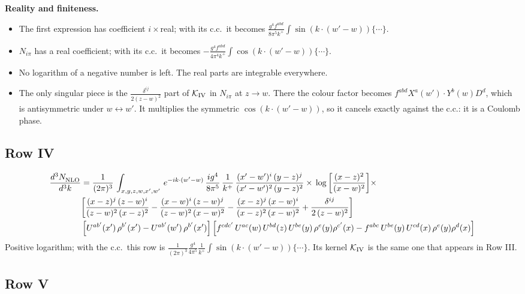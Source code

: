 \documentclass[9pt]{article}
\numberwithin{equation}{section}
\begin{document}
{\begin{align}
\end{align}
\textbf{Reality and finiteness.}
\begin{itemize}
\item The first expression has coefficient $i\times$real; with its c.c.\ it becomes $\frac{g^{4}f^{abd}}{8\pi^{5}k^{+}}\int\sin(k\cdot(w'-w))\{\cdots\}$.
\item $N_{i\pi}$ has a real coefficient; with its c.c.\ it becomes $-\frac{g^{4}f^{abd}}{4\pi^{4}k^{+}}\int\cos(k\cdot(w'-w))\{\cdots\}$.
\item No logarithm of a negative number is left. The real parts are integrable everywhere.
\item The only singular piece is the $\frac{\delta^{ij}}{2(z-w)^{2}}$ part of $\mathcal K_{\rm IV}$ in $N_{i\pi}$ at $z\to w$. There the colour factor becomes $f^{abd}X^{a}(w')\cdot Y^{b}(w)D^{d}$, which is antisymmetric under $w\leftrightarrow w'$. It multiplies the symmetric $\cos(k\cdot(w'-w))$, so it cancels exactly against the c.c.: it is a Coulomb phase.
\end{itemize}}
\subsection{Row IV}
\begin{align}
    \frac{d^{3}N_{\rm NLO}^{\rm}}{d^{3}k}  & =   \frac{1}{(2\pi)^{3}}\,
    \int_{x,y,z,w,x',w'}\,e^{-ik\cdot (w^\prime-w)}\, \frac{ig^{4}}{8\pi^{5}}\,\frac{1}{k^{+}}\,\frac{(x'-w')^{i}\,(y-z)^{j}}{(x'-w')^{2}\,(y-z)^{2}}\times\,\log{\left[\frac{(x-z)^{2}}{(x-w)^{2}}\right]}\times\notag \\ &  \bigg[\frac{(x-z)^{j}\,(z-w)^{i}}{(z-w)^{2}\,(x-z)^{2}} -\frac{(x-w)^{i}\,(z-w)^{j}}{(z-w)^{2}\,(x-w)^{2}}-\frac{(x-z)^{j}\,(x-w)^{i}}{(x-z)^{2}\,(x-w)^{2}}+\frac{\delta^{ij}}{2\,(z-w)^{2}}\bigg]\notag \\ &  \left[U^{ab'}(x')\,\rho^{b'}(x')-U^{ab'}(w')\,\rho^{b'}(x')\right] \left[f^{cdc'}\,U^{ac}(w)\,U^{bd}(z)\,U^{be}(y)\,\rho^{e}(y)\rho^{c'}(x)-f^{abc}\,U^{be}(y)\,U^{cd}(x)\,\rho^{e}(y)\rho^{d}(x)\right]
\end{align}
{\color{red}Positive logarithm; with the c.c.\ this row is $\frac{1}{(2\pi)^{3}}\frac{g^{4}}{4\pi^{5}}\frac{1}{k^{+}}\int\sin(k\cdot(w'-w))\{\cdots\}$. Its kernel $\mathcal K_{\rm IV}$ is the same one that appears in Row III.}
\subsection{Row V}
\end{document}
